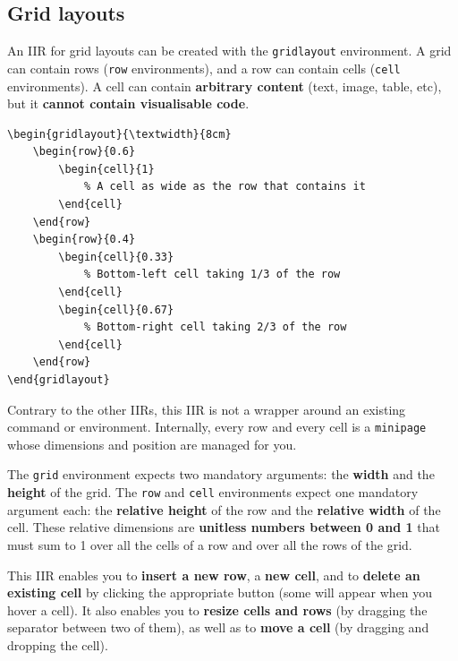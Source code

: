 \documentclass[11pt, a4paper]{article}
\begin{document}
\newpage
\subsection{Grid layouts}

An IIR for grid layouts can be created with the \texttt{gridlayout} environment.
A grid can contain rows (\texttt{row} environments), and a row can contain cells (\texttt{cell} environments).
A cell can contain \textbf{arbitrary content} (text, image, table, etc), but it \textbf{cannot contain visualisable code}.

\begin{lstlisting}[style=custom-latex]
% this grid is as wide as the text (\textwidth) and 8cm tall
\begin{gridlayout}{\textwidth}{8cm}
    \begin{row}{0.6}
        \begin{cell}{1}
            % A cell as wide as the row that contains it
        \end{cell}
    \end{row}
    \begin{row}{0.4}
        \begin{cell}{0.33}
            % Bottom-left cell taking 1/3 of the row
        \end{cell}
        \begin{cell}{0.67}
            % Bottom-right cell taking 2/3 of the row
        \end{cell}
    \end{row}
\end{gridlayout}
\end{lstlisting}

Contrary to the other IIRs, this IIR is not a wrapper around an existing command or environment.
Internally, every row and every cell is a \texttt{minipage} whose dimensions and position are managed for you.

The \texttt{grid} environment expects two mandatory arguments: the \textbf{width} and the \textbf{height} of the grid.
The \texttt{row} and \texttt{cell} environments expect one mandatory argument each: the \textbf{relative height} of the row and the \textbf{relative width} of the cell. These relative dimensions are \textbf{unitless numbers between 0 and 1} that must sum to 1 over all the cells of a row and over all the rows of the grid.

This IIR enables you to \textbf{insert a new row}, a \textbf{new cell}, and to \textbf{delete an existing cell} by clicking the appropriate button (some will appear when you hover a cell). It also enables you to \textbf{resize cells and rows} (by dragging the separator between two of them), as well as to \textbf{move a cell} (by dragging and dropping the cell).
\end{document}

